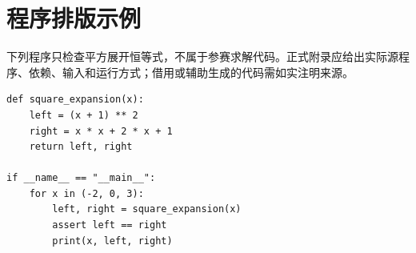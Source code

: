 \section{程序排版示例}\label{app:demo}
下列程序只检查平方展开恒等式，不属于参赛求解代码。正式附录应给出实际源程序、依赖、输入和运行方式；借用或辅助生成的代码需如实注明来源。
\begin{lstlisting}[caption={Python 最小可运行示例}]
def square_expansion(x):
    left = (x + 1) ** 2
    right = x * x + 2 * x + 1
    return left, right

if __name__ == "__main__":
    for x in (-2, 0, 3):
        left, right = square_expansion(x)
        assert left == right
        print(x, left, right)
\end{lstlisting}
